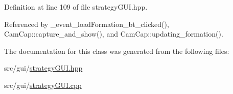 Definition at line 109 of file strategy\+G\+U\+I.\+hpp.



Referenced by \+\_\+event\+\_\+load\+Formation\+\_\+bt\+\_\+clicked(), Cam\+Cap\+::capture\+\_\+and\+\_\+show(), and Cam\+Cap\+::updating\+\_\+formation().



The documentation for this class was generated from the following files\+:\begin{DoxyCompactItemize}
\item 
src/gui/\hyperlink{strategy_g_u_i_8hpp}{strategy\+G\+U\+I.\+hpp}\item 
src/gui/\hyperlink{strategy_g_u_i_8cpp}{strategy\+G\+U\+I.\+cpp}\end{DoxyCompactItemize}
